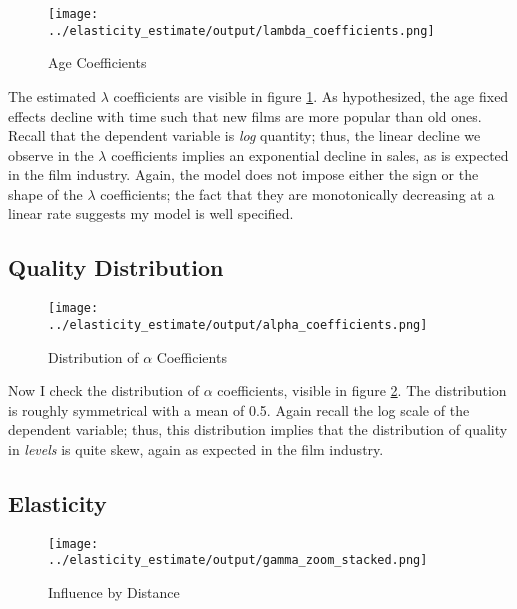 \documentclass{article}
\begin{document}
\begin{figure}
    \begin{center}
        \texttt{[image: ../elasticity\_estimate/output/lambda\_coefficients.png]}
        \caption{Age Coefficients}
        \label{fig:age_coefs}
    \end{center}
\end{figure}

The estimated $\lambda$ coefficients are visible in figure \ref{fig:age_coefs}. As hypothesized, the age fixed effects decline with time such that new films are more popular than old ones. Recall that the dependent variable is \emph{log} quantity; thus, the linear decline we observe in the $\lambda$ coefficients implies an exponential decline in sales, as is expected in the film industry. Again, the model does not impose either the sign or the shape of the $\lambda$ coefficients; the fact that they are monotonically decreasing at a linear rate suggests my model is well specified.

\subsection{Quality Distribution}

\begin{figure}
    \begin{center}
        \texttt{[image: ../elasticity\_estimate/output/alpha\_coefficients.png]}
        \caption{Distribution of $\alpha$ Coefficients}
        \label{fig:alpha_dist}
    \end{center}
\end{figure}

Now I check the distribution of $\alpha$ coefficients, visible in figure \ref{fig:alpha_dist}. The distribution is roughly symmetrical with a mean of 0.5. Again recall the log scale of the dependent variable; thus, this distribution implies that the distribution of quality in \emph{levels} is quite skew, again as expected in the film industry. 

\subsection{Elasticity}

\begin{figure}
    \begin{center}
        \texttt{[image: ../elasticity\_estimate/output/gamma\_zoom\_stacked.png]}
        \caption{Influence by Distance}
        \label{fig:gamma_zoomed}
    \end{center}
\end{figure}
\end{document}
